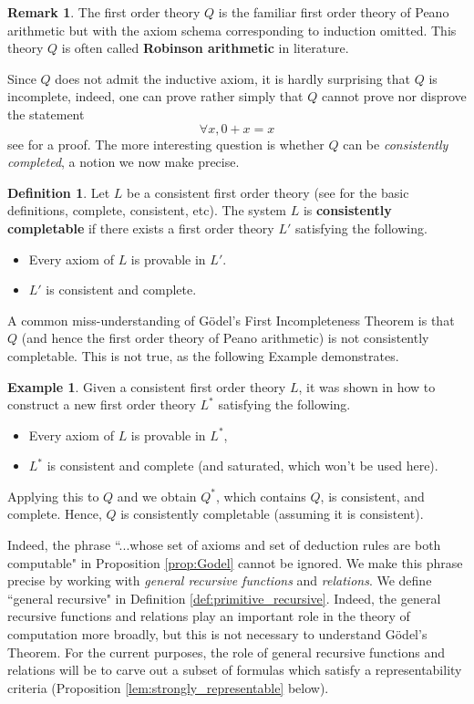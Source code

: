 \documentclass[12pt]{article}
\theoremstyle{plain}
\theoremstyle{definition}
\newtheorem{defn}[thm]{Definition} %
\newtheorem{remark}[thm]{Remark}
\newtheorem{example}[thm]{Example}
\begin{document}
	\begin{remark}
		The first order theory $Q$ is the familiar first order theory of Peano arithmetic but with the axiom schema corresponding to induction omitted. This theory $Q$ is often called \textbf{Robinson arithmetic} in literature.
	\end{remark}
	Since $Q$ does not admit the inductive axiom, it is hardly surprising that $Q$ is incomplete, indeed, one can prove rather simply that $Q$ cannot prove nor disprove the statement
	\begin{equation}
		\forall x, 0 + x = x
	\end{equation}
	see \cite[\S 8.4]{smith} for a proof. The more interesting question is whether $Q$ can be \emph{consistently completed}, a notion we now make precise.
	\begin{defn}
		Let $L$ be a consistent first order theory (see \cite{Billy} for the basic definitions, complete, consistent, etc). The system $L$ is \textbf{consistently completable} if there exists a first order theory $L'$ satisfying the following.
		\begin{itemize}
			\item Every axiom of $L$ is provable in $L'$.
			\item $L'$ is consistent and complete.
		\end{itemize}
	\end{defn}
	A common miss-understanding of G\"{o}del's First Incompleteness Theorem is that $Q$ (and hence the first order theory of Peano arithmetic) is not consistently completable. This is not true, as the following Example demonstrates.
	\begin{example}\label{ex:is_doable}
		Given a consistent first order theory $L$, it was shown in \cite[Theorem 1]{Billy} how to construct a new first order theory $L^\ast$ satisfying the following.
		\begin{itemize}
			\item Every axiom of $L$ is provable in $L^\ast$,
			\item $L^\ast$ is consistent and complete (and saturated, which won't be used here).
		\end{itemize}
		Applying this to $Q$ and we obtain $Q^\ast$, which contains $Q$, is consistent, and complete. Hence, $Q$ is consistently completable (assuming it is consistent).
	\end{example}
	Indeed, the phrase ``...whose set of axioms and set of deduction rules are both computable" in Proposition \ref{prop:Godel} cannot be ignored. We make this phrase precise by working with \emph{general recursive functions} and \emph{relations}. We define ``general recursive" in Definition \ref{def:primitive_recursive}. Indeed, the general recursive functions and relations play an important role in the theory of computation more broadly, but this is not necessary to understand G\"{o}del's Theorem. For the current purposes, the role of general recursive functions and relations will be to carve out a subset of formulas which satisfy a representability criteria (Proposition \ref{lem:strongly_representable} below).
	
\end{document}
